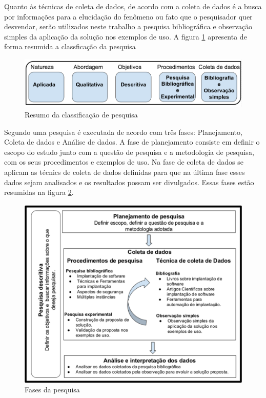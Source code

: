Quanto às técnicas de coleta de dados, de acordo com \cite{gerhardt2009metodos}
a coleta de dados é a busca por informações para a elucidação do fenômeno ou
fato que o pesquisador quer desvendar, serão utilizados neste trabalho a pesquisa
bibliográfica e observação simples da aplicação da solução nos exemplos de uso.
A figura \ref{fig:metodologia1} apresenta de forma resumida a classficação da pesquisa

\begin{figure}[h]
  \centering
  \includegraphics[width=1.0\textwidth]
      {figuras/metodologia1.eps}
  \caption{Resumo da classificação de pesquisa}
  \label{fig:metodologia1}
\end{figure}

Segundo \cite{andre2008estudo} uma pesquisa é executada de acordo com três fases:
Planejamento, Coleta de dados e Análise de dados. A fase de planejamento consiste
em definir o escopo do estudo junto com a questão de pesquisa e a metodologia
de pesquisa, com os seus procedimentos e exemplos de uso. Na fase de coleta de dados
se aplicam as técnics de coleta de dados definidas para que na última fase esses
dados sejam analisados e os resultados possam ser divulgados. Essas fases estão
resumidas na figura \ref{fig:metodologia2}.

\begin{figure}[H]
  \centering
  \includegraphics[width=1.0\textwidth]
      {figuras/metodologia2.eps}
  \caption{Fases da pesquisa}
  \label{fig:metodologia2}
\end{figure}

